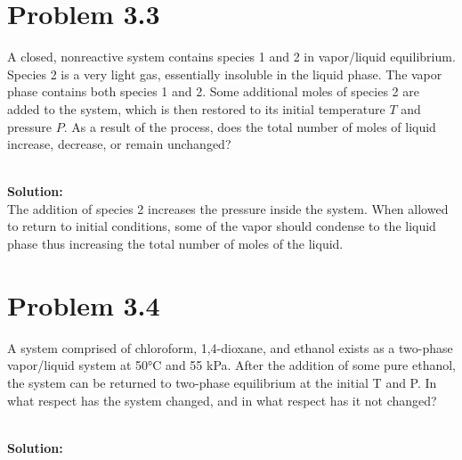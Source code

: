 \documentclass{article}
\newenvironment{solution}{\par\noindent\textbf{\\Solution:\\}}{\par\medskip}
\begin{document}
\section*{Problem 3.3}
A closed, nonreactive system contains species 1 and 2 in vapor/liquid equilibrium. Species 2 is a very light gas, essentially insoluble in the liquid phase. The vapor phase contains both species 1 and 2. Some additional moles of species 2 are added to the system, which is then restored to its initial temperature \( T \) and pressure \( P \). As a result of the process, does the total number of moles of liquid increase, decrease, or remain unchanged?

\begin{solution}
      The addition of species 2 increases the pressure inside the system. When allowed to return to initial conditions, some of the vapor should condense to the liquid phase thus increasing the total number of moles of the liquid.
\end{solution}

\section*{Problem 3.4}
A system comprised of chloroform, 1,4-dioxane, and ethanol exists as a two-phase vapor/liquid system at 50°C and 55 kPa. After the addition of some pure ethanol, the system can be returned to two-phase equilibrium at the initial T and P. In what respect has the system changed, and in what respect has it not changed?

\begin{solution}
      
\end{solution}
\end{document}
